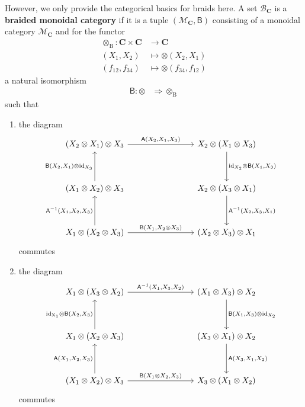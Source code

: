 However, we only provide the categorical basics for braids here.
A set $\mathcal{B}_{\mathbf{C}}$ is a \textbf{braided monoidal category} if it is a tuple $(\mathcal{M}_{\mathbf{C}},\mathsf{B})$ consisting of a monoidal category $\mathcal{M}_{\mathbf{C}}$ and for the functor
\begin{align*}
  \otimes_{\textrm{B}}
  \colon
  \mathbf{C}
  \times
  \mathbf{C}
  &\rightarrow
  \mathbf{C}
  \\
  (X_{1},X_{2})
  &\mapsto
  \otimes(X_{2},X_{1})
  \\
  (f_{12},f_{34})
  &\mapsto
  \otimes(f_{34},f_{12})
\end{align*}
a natural isomorphism
\begin{align*}
  \mathsf{B}
  \colon
  \otimes
  &\Rightarrow
  \otimes_{\textrm{B}}
\end{align*}
such that
\begin{enumerate}
\item[(BC1)]
the diagram
\[
\begin{tikzcd}[row sep=huge,column sep=8em]
  (X_{2} \otimes X_{1})
  \otimes
  X_{3}
  \arrow{r}{\mathsf{A}(X_{2},X_{1},X_{3})}
  &
  X_{2}
  \otimes
  (X_{1} \otimes X_{3})
  \arrow{d}{\mathrm{id}_{X_{2}} \otimes \mathsf{B}(X_{1},X_{3})}
  \\
  (X_{1} \otimes X_{2})
  \otimes
  X_{3}
  \arrow{u}{\mathsf{B}(X_{2},X_{1}) \otimes \mathrm{id}_{X_{3}}}
  &
  X_{2}
  \otimes
  (X_{3} \otimes X_{1})
  \arrow{d}{\mathsf{A}^{-1}(X_{2},X_{3},X_{1})}
  \\
  X_{1}
  \otimes
  (X_{2} \otimes X_{3})
  \arrow{u}{\mathsf{A}^{-1}(X_{1},X_{2},X_{3})}
  \arrow{r}{\mathsf{B}(X_{1},X_{2} \otimes X_{3})}
  &
  (X_{2} \otimes X_{3})
  \otimes
  X_{1}
\end{tikzcd}
\]
commutes
\item[(BC2)]
the diagram
\[
\begin{tikzcd}[row sep=huge,column sep=8em]
  X_{1}
  \otimes
  (X_{3} \otimes X_{2})
  \arrow{r}{\mathsf{A}^{-1}(X_{1},X_{3},X_{2})}
  &
  (X_{1} \otimes X_{3})
  \otimes
  X_{2}
  \arrow{d}{\mathsf{B}(X_{1},X_{3}) \otimes \mathrm{id}_{X_{2}}}
  \\
  X_{1}
  \otimes
  (X_{2} \otimes X_{3})
  \arrow{u}{\mathrm{id_{X_{1}}} \otimes \mathsf{B}(X_{2},X_{3})}
  &
  (X_{3} \otimes X_{1})
  \otimes
  X_{2}
  \arrow{d}{\mathsf{A}(X_{3},X_{1},X_{2})}
  \\
  (X_{1} \otimes X_{2})
  \otimes
  X_{3}
  \arrow{u}{\mathsf{A}(X_{1},X_{2},X_{3})}
  \arrow{r}{\mathsf{B}(X_{1} \otimes X_{2},X_{3})}
  &
  X_{3}
  \otimes
  (X_{1} \otimes X_{2})
\end{tikzcd}
\]
commutes
\end{enumerate}
